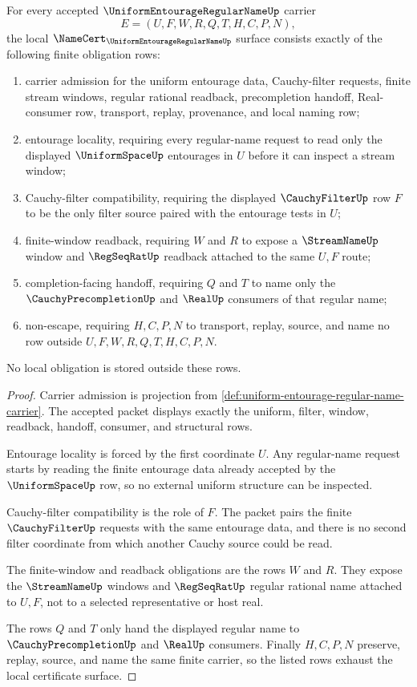 \begin{theorem}
\label{thm:uniform-entourage-regular-name-namecert-obligations}
For every accepted $\UniformEntourageRegularNameUp$ carrier
$$
E=(U,F,W,R,Q,T,H,C,P,N),
$$
the local $\NameCert_{\UniformEntourageRegularNameUp}$ surface consists exactly of the following finite obligation rows:
\begin{enumerate}
\item carrier admission for the uniform entourage data, Cauchy-filter requests, finite stream windows, regular rational readback, precompletion handoff, Real-consumer row, transport, replay, provenance, and local naming row;
\item entourage locality, requiring every regular-name request to read only the displayed $\UniformSpaceUp$ entourages in $U$ before it can inspect a stream window;
\item Cauchy-filter compatibility, requiring the displayed $\CauchyFilterUp$ row $F$ to be the only filter source paired with the entourage tests in $U$;
\item finite-window readback, requiring $W$ and $R$ to expose a $\StreamNameUp$ window and $\RegSeqRatUp$ readback attached to the same $U,F$ route;
\item completion-facing handoff, requiring $Q$ and $T$ to name only the $\CauchyPrecompletionUp$ and $\RealUp$ consumers of that regular name;
\item non-escape, requiring $H,C,P,N$ to transport, replay, source, and name no row outside $U,F,W,R,Q,T,H,C,P,N$.
\end{enumerate}
No local obligation is stored outside these rows.
\end{theorem}
\begin{proof}
Carrier admission is projection from \autoref{def:uniform-entourage-regular-name-carrier}. The accepted packet displays exactly the uniform, filter, window, readback, handoff, consumer, and structural rows.

Entourage locality is forced by the first coordinate $U$. Any regular-name request starts by reading the finite entourage data already accepted by the $\UniformSpaceUp$ row, so no external uniform structure can be inspected.

Cauchy-filter compatibility is the role of $F$. The packet pairs the finite $\CauchyFilterUp$ requests with the same entourage data, and there is no second filter coordinate from which another Cauchy source could be read.

The finite-window and readback obligations are the rows $W$ and $R$. They expose the $\StreamNameUp$ windows and $\RegSeqRatUp$ regular rational name attached to $U,F$, not to a selected representative or host real.

The rows $Q$ and $T$ only hand the displayed regular name to $\CauchyPrecompletionUp$ and $\RealUp$ consumers. Finally $H,C,P,N$ preserve, replay, source, and name the same finite carrier, so the listed rows exhaust the local certificate surface.
\end{proof}


